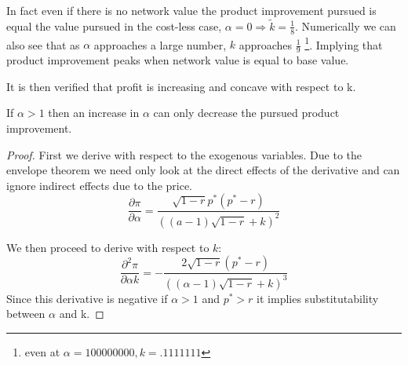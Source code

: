 In fact even if there is no network value the product improvement pursued is equal the value pursued in the cost-less case,  $\alpha=0 \Rightarrow \tilde{k} = \frac{1}{8}$. Numerically we can also see that as $\alpha$ approaches a large number, $k$ approaches $\frac{1}{9}$
\footnote{even at $\alpha=100 000 000, k=.1111111$  }. Implying that product improvement peaks when network value is equal to base value. 








It is then verified that profit is increasing and concave with respect to k. 

\begin{proposition}
\label{alphak}
If $\alpha>1$ then an increase in $\alpha$ can only decrease the pursued product improvement. 
\end{proposition}

\begin{proof}
First we derive with respect to the exogenous variables. Due to the envelope theorem we need only look at the direct effects of the derivative and can ignore indirect effects due to the price. 
\begin{equation*}
\frac{\partial \pi }{\partial \alpha} =\frac{\sqrt{1-r}p^* (p^*-r)}{\left((a-1) \sqrt{1-r}+k\right)^2}
\end{equation*}

We then proceed to derive with respect to $k$:
\begin{equation*}
\frac{\partial^2 \pi }{\partial \alpha k} =
-\frac{2 \sqrt{1-r} (p^*-r)}{\left((\alpha-1) \sqrt{1-r}+k\right)^3}
\end{equation*}
Since this derivative is negative if $\alpha>1$ and $p^*>r$ it implies substitutability between $\alpha$ and k.  
\end{proof}


